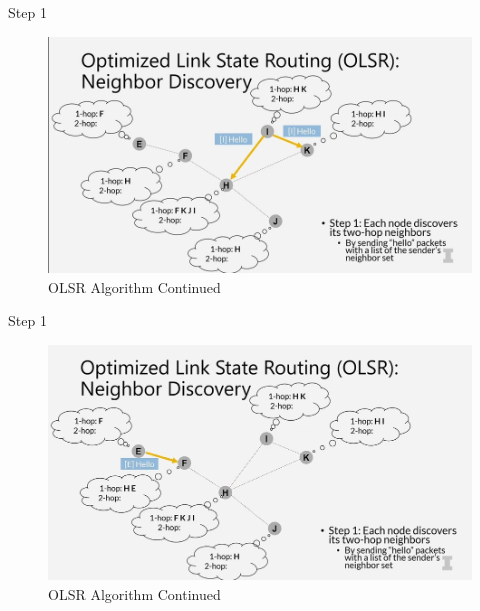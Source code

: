 \documentclass[11pt]{beamer}              %
\begin{document}
\begin{frame}{Step 1}

    \begin{figure}
        \centering
        \includegraphics[width=\textwidth]{figures/olsr5.png}
        \caption{OLSR Algorithm Continued \cite{coursera}}
    \end{figure}    
    
\end{frame}

\begin{frame}{Step 1}

    \begin{figure}
        \centering
        \includegraphics[width=\textwidth]{figures/olsr6.png}
        \caption{OLSR Algorithm Continued \cite{coursera}}
    \end{figure}    
    
\end{frame}
\end{document}
